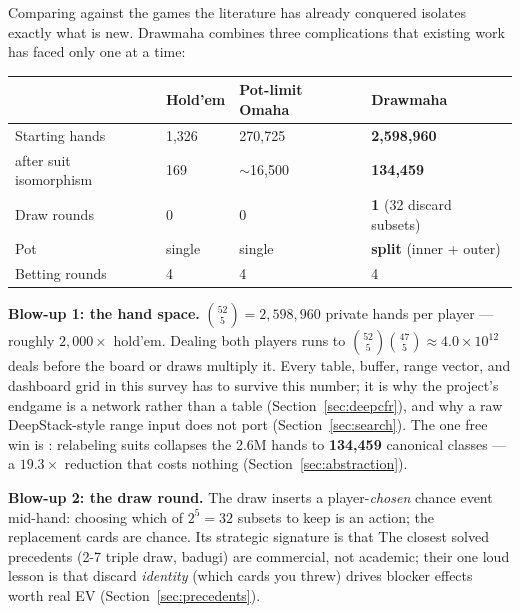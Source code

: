 Comparing against the games the literature has already conquered isolates exactly what is new. Drawmaha combines three complications that existing work has faced only one at a time:

\begin{center}
\footnotesize
\begin{tabular}{@{}llll@{}}
\toprule
 & Hold'em & Pot-limit Omaha & \textbf{Drawmaha} \\
\midrule
Starting hands & 1{,}326 & 270{,}725 & \textbf{2{,}598{,}960} \\
\quad after suit isomorphism & 169 & $\sim$16{,}500 & \textbf{134{,}459} \\
Draw rounds & 0 & 0 & \textbf{1} (32 discard subsets) \\
Pot & single & single & \textbf{split} (inner + outer) \\
Betting rounds & 4 & 4 & 4 \\
\bottomrule
\end{tabular}
\end{center}

\textbf{Blow-up 1: the hand space.} $\binom{52}{5} = 2{,}598{,}960$ private hands per player --- roughly $2{,}000\times$ hold'em. Dealing both players runs to $\binom{52}{5}\binom{47}{5} \approx 4.0\times10^{12}$ deals before the board or draws multiply it. Every table, buffer, range vector, and dashboard grid in this survey has to survive this number; it is why the project's endgame is a network rather than a table (Section~\ref{sec:deepcfr}), and why a raw DeepStack-style range input does not port (Section~\ref{sec:search}). The one free win is : relabeling suits collapses the 2.6M hands to \textbf{134{,}459} canonical classes --- a $19.3\times$ reduction that costs nothing (Section~\ref{sec:abstraction}).

\textbf{Blow-up 2: the draw round.} The draw inserts a player-\emph{chosen} chance event mid-hand: choosing which of $2^5=32$ subsets to keep is an action; the replacement cards are chance. Its strategic signature is that  The closest solved precedents (2-7 triple draw, badugi) are commercial, not academic; their one loud lesson is that discard \emph{identity} (which cards you threw) drives blocker effects worth real EV (Section~\ref{sec:precedents}).

